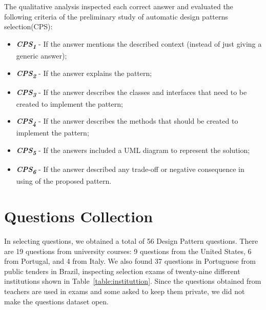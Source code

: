 The qualitative analysis inspected each correct answer and evaluated the following criteria of the preliminary study of automatic design patterns selection(CPS): 
\begin{itemize}
\item \textbf{\textit{CPS\textsubscript{1}}} - If the answer mentions the described context (instead of just giving a generic answer); 
\item \textbf{\textit{CPS\textsubscript{2}}} - If the answer explains the pattern;
\item \textbf{\textit{CPS\textsubscript{3}}} - If the answer describes the classes and interfaces that need to be created to implement the pattern; 
\item \textbf{\textit{CPS\textsubscript{4}}} - If the answer describes the methods that should be created to implement the pattern; 
\item \textbf{\textit{CPS\textsubscript{5}}} - If the answers included a UML diagram to represent the solution; 
\item \textbf{\textit{CPS\textsubscript{6}}} - If the answer described any trade-off or negative consequence in using of the proposed pattern.
\end{itemize}

\section{Questions Collection}\label{QuestionDatabasePreliminaryStudy}

In selecting questions, we obtained a total of 56 Design Pattern questions. There are 19 questions from university courses: 9 questions from the United States, 6 from Portugal, and 4 from Italy. We also found 37 questions in Portuguese from public tenders in Brazil, inspecting selection exams of twenty-nine different institutions shown in Table~\ref{table:instituttion}. Since the questions obtained from teachers are used in exams and some asked to keep them private, we did not make the questions dataset open.

